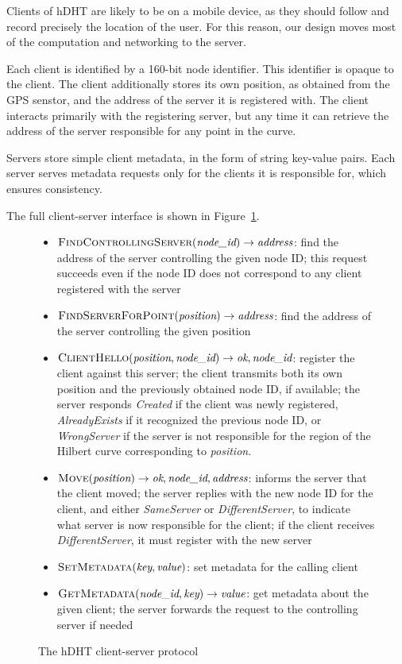 Clients of hDHT are likely to be on a mobile device, as they should follow and record precisely the location of the user.
For this reason, our design moves most of the computation and networking to the server.

Each client is identified by a 160-bit node identifier.
This identifier is opaque to the client.
The client additionally stores its own position, as obtained from the GPS senstor, and the address of the server it is registered with.
The client interacts primarily with the registering server, but any time it can retrieve the address of the server responsible for any point in the curve.

Servers store simple client metadata, in the form of string key-value pairs.
Each server serves metadata requests only for the clients it is responsible for, which ensures consistency.

The full client-server interface is shown in Figure~\ref{fig:client-server}.

\begin{figure}
\small
\begin{itemize}
\item $\textsc{FindControllingServer}(\textit{node\_id}) \rightarrow \textit{address}$: find the address of the server controlling the given node ID; this request succeeds even if the node ID does not correspond to any client registered with the server
\item $\textsc{FindServerForPoint}(\textit{position}) \rightarrow \textit{address}$: find the address of the server controlling the given position
\item $\textsc{ClientHello}(\textit{position}, \textit{node\_id}) \rightarrow \textit{ok}, \textit{node\_id}$: register the client against this server; the client transmits both its own position and the previously obtained node ID, if available; the server responds \textit{Created} if the client was newly registered, \textit{AlreadyExists} if it recognized the previous node ID, or \textit{WrongServer} if the server is not responsible for the region of the Hilbert curve corresponding to \textit{position}.
\item $\textsc{Move}(\textit{position}) \rightarrow \textit{ok}, \textit{node\_id}, \textit{address}$: informs the server that the client moved; the server replies with the new node ID for the client, and either \textit{SameServer} or \textit{DifferentServer}, to indicate what server is now responsible for the client; if the client receives \textit{DifferentServer}, it must register with the new server
\item $\textsc{SetMetadata}(\textit{key}, \textit{value})$: set metadata for the calling client
\item $\textsc{GetMetadata}(\textit{node\_id}, \textit{key}) \rightarrow \textit{value}$: get metadata about the given client; the server forwards the request to the controlling server if needed
\end{itemize}
\caption{The hDHT client-server protocol}
\label{fig:client-server}
\end{figure}

